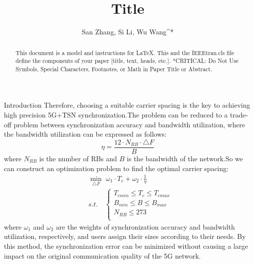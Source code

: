 \documentclass[english]{cccconf}
\begin{document}
	
	\title{Title}
	
	\author{San Zhang, Si Li, Wu Wang^*}
	
	
	
	
	
	\maketitle


\begin{abstract}
This document is a model and instructions for \LaTeX.
This and the IEEEtran.cls file define the components of your paper [title, text, heads, etc.]. *CRITICAL: Do Not Use Symbols, Special Characters, Footnotes, 
or Math in Paper Title or Abstract.
\end{abstract}




Introduction
Therefore, choosing a suitable carrier spacing is the key to achieving high precision 5G+TSN synchronization.The problem can be reduced to a trade-off problem between synchronization accuracy and bandwidth utilization, where the bandwidth utilization can be expressed as follows:
\begin{equation}
	\eta=\frac{12\cdot N_{RB}\cdot \triangle F}{B}
\end{equation}
where $N_{RB}$ is the number of RBs and $B$ is the bandwidth of the network.So we can construct an optimization problem to find the optimal carrier spacing:
\begin{equation}
	\begin{split}
		&\min_{\triangle F} \,\, \omega_1 \cdot T_c+\omega_2 \cdot \frac{1}{\eta} \\
		&s.t.\quad  \left\{\begin{array}{lc}
			T_{cmin}\leq T_c \leq T_{cmax}\\
			B_{min}\leq B \leq B_{max}\\
			N_{RB}\leq 273\\
		\end{array}\right.
	\end{split}
\end{equation}
where $\omega_1$ and $\omega_2$ are the weights of synchronization accuracy and bandwidth utilization, respectively, and users assign their sizes according to their needs. By this method, the synchronization error can be minimized without causing a large impact on the original communication quality of the 5G network.
\end{document}
